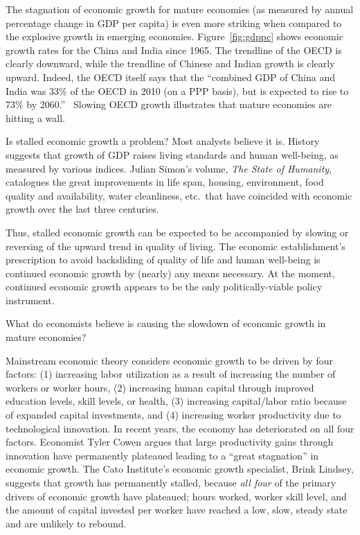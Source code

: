 The stagnation of economic growth for mature economies 
(as measured by annual percentage change in GDP per capita) 
is even more striking 
when compared to the explosive growth in emerging economies. 
Figure~\ref{fig:gdppc} shows 
economic growth rates for the China and India since 1965. 
The trendline of the OECD is clearly downward, 
while the trendline of Chinese and Indian growth is clearly upward.  
Indeed, the OECD itself says that the 
``combined GDP of China and India was 33\% of the OECD in 2010 
(on a PPP basis), 
but is expected to rise to 73\% by 2060.''~\cite[p. 214]{OECD2014} 
Slowing OECD growth illustrates that mature economies are hitting a wall.

Is stalled economic growth a problem? 
Most analysts believe it is. 
History suggests that growth of GDP 
raises living standards and human well-being,
as measured by various indices. 
Julian Simon's volume, \emph{The State of Humanity}, 
catalogues the great improvements in 
life span, 
housing, 
environment, 
food quality and availability, 
water cleanliness, 
etc.\ 
that have coincided with 
economic growth over the last three centuries.\cite{simon1996} 

Thus, stalled economic growth can be expected 
to be accompanied by slowing or reversing
of the upward trend in quality of living. 
The economic establishment's prescription
to avoid backsliding of quality of life and human well-being
is continued economic growth by (nearly) any means necessary. 
At the moment, continued economic growth appears to be the only 
politically-viable policy instrument.

What do economists believe is causing the slowdown
of economic growth in mature economies? 

Mainstream economic theory considers 
economic growth to be driven by four factors: 
(1) increasing labor utilization as a result of increasing the number of workers or worker hours, 
(2) increasing human capital through improved education levels, skill levels, or health, 
(3) increasing capital/labor ratio because of expanded capital investments, and 
(4) increasing worker productivity due to technological innovation. 
In recent years, the economy has deteriorated on all four factors.
Economist Tyler Cowen argues that large productivity gains 
through innovation have permanently plateaued 
leading to a ``great stagnation'' in economic growth.\cite{Cowen2011}
The Cato Institute's economic growth specialist, Brink Lindsey, 
suggests that growth has permanently stalled, 
because \emph{all four} of the primary drivers of economic growth have plateaued; 
hours worked, 
worker skill level, and
the amount of capital invested per worker 
have reached 
a low, slow, steady state 
and are unlikely to rebound.\cite{lindsey2013} 

